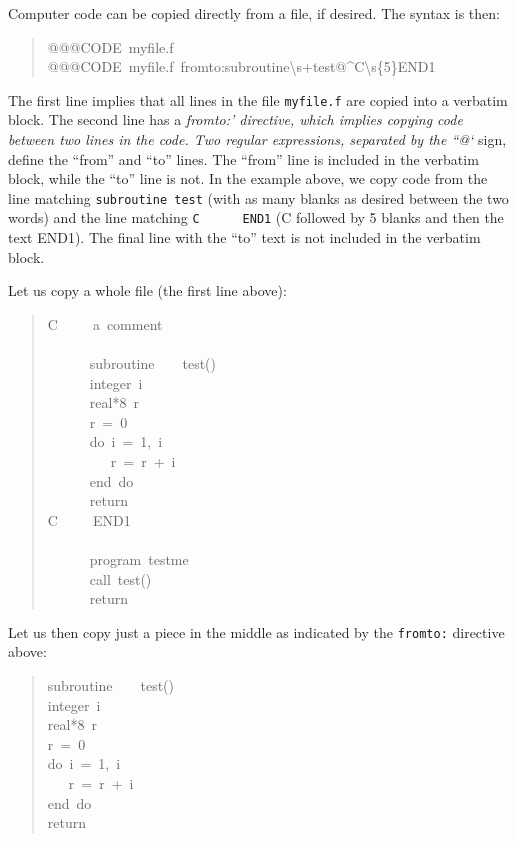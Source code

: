 \documentclass[a4paper,english]{article}
\providecommand*{\DUroletitlereference}[1]{\textsl{#1}}
\begin{document}
Computer code can be copied directly from a file, if desired. The syntax
is then:
%
\begin{quote}{\ttfamily \raggedright \noindent
@@@CODE~myfile.f\\
@@@CODE~myfile.f~fromto:subroutine\textbackslash{}s+test@\textasciicircum{}C\textbackslash{}s\{5\}END1
}
\end{quote}

The first line implies that all lines in the file \texttt{myfile.f} are copied
into a verbatim block. The second line has a \DUroletitlereference{fromto:' directive, which
implies copying code between two lines in the code. Two regular
expressions, separated by the ``@`} sign, define the ``from'' and ``to'' lines.
The ``from'' line is included in the verbatim block, while the ``to'' line
is not. In the example above, we copy code from the line matching
\texttt{subroutine test} (with as many blanks as desired between the two words)
and the line matching \texttt{C ~ ~ ~END1} (C followed by 5 blanks and then
the text END1). The final line with the ``to'' text is not
included in the verbatim block.

Let us copy a whole file (the first line above):
%
\begin{quote}{\ttfamily \raggedright \noindent
C~~~~~a~comment\\
~\\
~~~~~~subroutine~~~~test()\\
~~~~~~integer~i\\
~~~~~~real*8~r\\
~~~~~~r~=~0\\
~~~~~~do~i~=~1,~i\\
~~~~~~~~~r~=~r~+~i\\
~~~~~~end~do\\
~~~~~~return\\
C~~~~~END1\\
~\\
~~~~~~program~testme\\
~~~~~~call~test()\\
~~~~~~return
}
\end{quote}

Let us then copy just a piece in the middle as indicated by the \texttt{fromto:}
directive above:
%
\begin{quote}{\ttfamily \raggedright \noindent
subroutine~~~~test()\\
integer~i\\
real*8~r\\
r~=~0\\
do~i~=~1,~i\\
~~~r~=~r~+~i\\
end~do\\
return
}
\end{quote}
\end{document}
